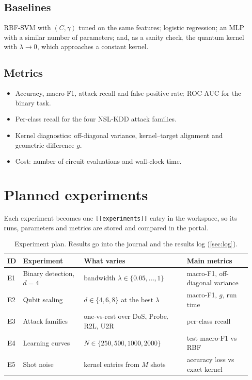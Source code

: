 \documentclass[11pt,a4paper]{article}
\begin{document}
\subsection{Baselines}
RBF-SVM with $(C,\gamma)$ tuned on the same features; logistic regression; an MLP with a similar
number of parameters; and, as a sanity check, the quantum kernel with $\lambda\to0$, which
approaches a constant kernel.

\subsection{Metrics}
\begin{itemize}
  \item Accuracy, macro-F1, attack recall and false-positive rate; ROC-AUC for the binary task.
  \item Per-class recall for the four NSL-KDD attack families.
  \item Kernel diagnostics: off-diagonal variance, kernel--target alignment and geometric difference $g$.
  \item Cost: number of circuit evaluations and wall-clock time.
\end{itemize}

\section{Planned experiments}
Each experiment becomes one \texttt{[[experiments]]} entry in the workspace, so its runs, parameters
and metrics are stored and compared in the portal.

\begin{table}[h]
\centering\small
\begin{tabularx}{\linewidth}{@{}l>{\raggedright}X>{\raggedright}X>{\raggedright\arraybackslash}X@{}}
\toprule
ID & Experiment & What varies & Main metrics \\
\midrule
  E1 & Binary detection, $d=4$ & bandwidth $\lambda\in\{0.05,\dots,1\}$ & macro-F1, off-diagonal variance \\
  E2 & Qubit scaling & $d\in\{4,6,8\}$ at the best $\lambda$ & macro-F1, $g$, run time \\
  E3 & Attack families & one-vs-rest over DoS, Probe, R2L, U2R & per-class recall \\
  E4 & Learning curves & $N\in\{250,500,1000,2000\}$ & test macro-F1 vs RBF \\
  E5 & Shot noise & kernel entries from $M$ shots & accuracy loss vs exact kernel \\
\bottomrule
\end{tabularx}
\caption{Experiment plan. Results go into the journal and the results log (\cref{sec:log}).}
\end{table}
\end{document}
